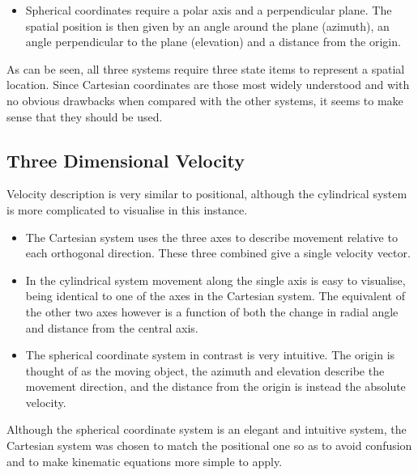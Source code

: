 \begin{itemize}
\item Spherical coordinates require a polar axis and a perpendicular plane. The spatial position is then given by an angle around the plane (azimuth), an angle perpendicular to the plane (elevation) and a distance from the origin.
\end{itemize}

As can be seen, all three systems require three state items to represent a spatial location. Since Cartesian coordinates are those most widely understood and with no obvious drawbacks when compared with the other systems, it seems to make sense that they should be used.

\subsection{Three Dimensional Velocity}
Velocity description is very similar to positional, although the cylindrical system is more complicated to visualise in this instance.
\begin{itemize}
\item The Cartesian system uses the three axes to describe movement relative to each orthogonal direction. These three combined give a single velocity vector.
\item In the cylindrical system movement along the single axis is easy to visualise, being identical to one of the axes in the Cartesian system. The equivalent of the other two axes however is a function of both the change in radial angle and distance from the central axis.
\item The spherical coordinate system in contrast is very intuitive. The origin is thought of as the moving object, the azimuth and elevation describe the movement direction, and the distance from the origin is instead the absolute velocity.
\end{itemize}

Although the spherical coordinate system is an elegant and intuitive system, the Cartesian system was chosen to match the positional one so as to avoid confusion and to make kinematic equations more simple to apply.

